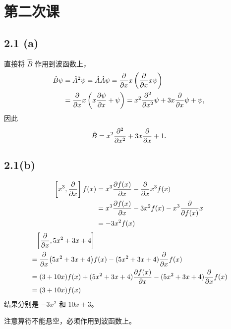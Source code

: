 \section{第二次课}

\subsection{2.1 (a)}
直接将 $\hat B$ 作用到波函数上，
\begin{align}
    \hat B \psi &= \hat A^2 \psi = \hat A \hat A \psi = \pdv{x}x \left(\pdv{x} x\psi\right) \\
    & = \pdv x x\left(x \pdv{\psi}{x} + \psi\right) = x^2 \pdv[2]{x} \psi + 3x \pdv{x}\psi + \psi,
\end{align}
因此
\begin{align}
    \hat B = x^2 \pdv[2]{x} + 3x \pdv{x} + 1.
\end{align}

\subsection{2.1(b)}
\begin{align}
    \left[x^3, \pdv{x}\right]f(x) &=
    x^3 \pdv{f(x)}{x} - \pdv{x} x^3 f(x) \\
    &= x^3 \pdv{f(x)}{x} - 3x^2 f(x) - x^3 \pdv{f(x)}x \\
    &= -3x^2 f(x)
\end{align}
\begin{align}
    &\phantom{=}\left[\pdv{x}, 5x^2 + 3x + 4\right] \\
    &= \pdv{x}(5x^2 + 3x + 4)f(x) - (5x^2 + 3x + 4) \pdv{x} f(x) \\
    &= (3+10x)f(x) + (5x^2 + 3x + 4) \pdv{f(x)}{x} - (5x^2 + 3x + 4) \pdv{x} f(x) \\
    &= (3+10x) f(x)
\end{align}
结果分别是 $-3x^2$ 和 $10x+3$。

注意算符不能悬空，必须作用到波函数上。


